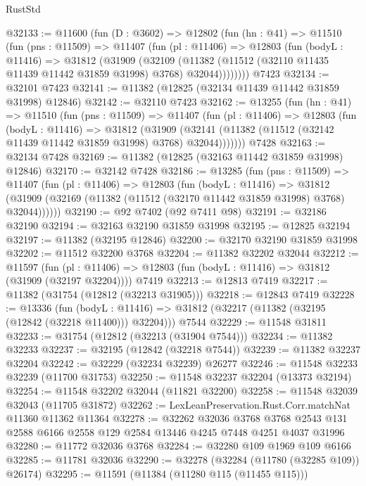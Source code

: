\begin{lexlean}{RustStd}
\begin{coremodule}
@32133 := @11600
    (fun (D : @3602) =>
    @12802
      (fun (hn : @41) =>
      @11510
        (fun (pns : @11509) =>
        @11407
          (fun (pl : @11406) =>
          @12803
            (fun (bodyL : @11416) =>
            @31812
              (@31909
                (@32109
                  (@11382 (@11512 (@32110 @11435 @11439 @11442 @31859 @31998) @3768) @32044))))))))
    @7423
@32134 := @32101 @7423
@32141 := @11382 (@12825 (@32134 @11439 @11442 @31859 @31998) @12846)
@32142 := @32110 @7423
@32162 := @13255
    (fun (hn : @41) =>
    @11510
      (fun (pns : @11509) =>
      @11407
        (fun (pl : @11406) =>
        @12803
          (fun (bodyL : @11416) =>
          @31812
            (@31909
              (@32141 (@11382 (@11512 (@32142 @11439 @11442 @31859 @31998) @3768) @32044)))))))
    @7428
@32163 := @32134 @7428
@32169 := @11382 (@12825 (@32163 @11442 @31859 @31998) @12846)
@32170 := @32142 @7428
@32186 := @13285
    (fun (pns : @11509) =>
    @11407
      (fun (pl : @11406) =>
      @12803
        (fun (bodyL : @11416) =>
        @31812 (@31909 (@32169 (@11382 (@11512 (@32170 @11442 @31859 @31998) @3768) @32044))))))
@32190 := @92 @7402 (@92 @7411 @98)
@32191 := @32186 @32190
@32194 := @32163 @32190 @31859 @31998
@32195 := @12825 @32194
@32197 := @11382 (@32195 @12846)
@32200 := @32170 @32190 @31859 @31998
@32202 := @11512 @32200 @3768
@32204 := @11382 @32202 @32044
@32212 := @11597
    (fun (pl : @11406) => @12803 (fun (bodyL : @11416) => @31812 (@31909 (@32197 @32204))))
    @7419
@32213 := @12813 @7419
@32217 := @11382 (@31754 (@12812 (@32213 @31905)))
@32218 := @12843 @7419
@32228 := @13336
    (fun (bodyL : @11416) => @31812 (@32217 (@11382 (@32195 (@12842 (@32218 @11400))) @32204)))
    @7544
@32229 := @11548 @31811
@32233 := @31754 (@12812 (@32213 (@31904 @7544)))
@32234 := @11382 @32233
@32237 := @32195 (@12842 (@32218 @7544))
@32239 := @11382 @32237 @32204
@32242 := @32229 (@32234 @32239) @26277
@32246 := @11548 @32233 @32239 (@11700 @31753)
@32250 := @11548 @32237 @32204 (@13373 @32194)
@32254 := @11548 @32202 @32044 (@11821 @32200)
@32258 := @11548 @32039 @32043 (@11705 @31872)
@32262 := LexLeanPreservation.Rust.Corr.matchNat @11360 @11362 @11364
@32278 := @32262
    @32036
    @3768
    @3768
    @2543
    @131
    @2588
    @6166
    @2558
    @129
    @2584
    @13446
    @4245
    @7448
    @4251
    @4037
    @31996
@32280 := @11772 @32036 @3768
@32284 := @32280 @109 @1969 @109 @6166
@32285 := @11781 @32036
@32290 := @32278 (@32284 (@11780 (@32285 @109)) @26174)
@32295 := @11591 (@11384 (@11280 @115 (@11455 @115)))

\end{coremodule}
\end{lexlean}
